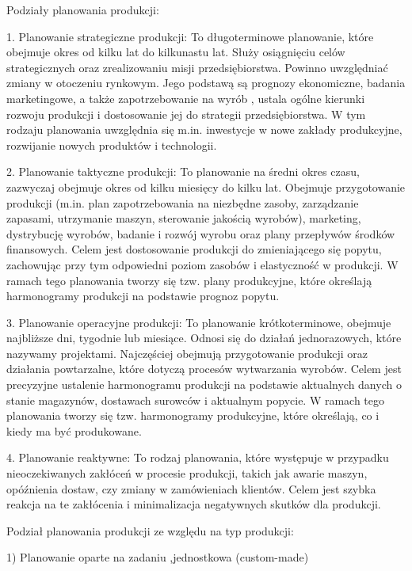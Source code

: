 Podziały planowania produkcji:

    1. Planowanie strategiczne produkcji: To długoterminowe planowanie, które obejmuje okres od kilku lat do kilkunastu lat. Służy osiągnięciu celów strategicznych oraz zrealizowaniu misji przedsiębiorstwa. Powinno uwzględniać zmiany w otoczeniu rynkowym. Jego podstawą są prognozy ekonomiczne, badania marketingowe, a także zapotrzebowanie na wyrób , ustala ogólne kierunki rozwoju produkcji i dostosowanie jej do strategii przedsiębiorstwa. W tym rodzaju planowania uwzględnia się m.in. inwestycje w nowe zakłady produkcyjne, rozwijanie nowych produktów i technologii.
    
    2. Planowanie taktyczne produkcji: To planowanie na średni okres czasu, zazwyczaj obejmuje okres od kilku miesięcy do kilku lat. Obejmuje przygotowanie produkcji (m.in. plan zapotrzebowania na niezbędne zasoby, zarządzanie zapasami, utrzymanie maszyn, sterowanie jakością wyrobów), marketing, dystrybucję wyrobów, badanie i rozwój wyrobu oraz plany przepływów środków finansowych. Celem jest dostosowanie produkcji do zmieniającego się popytu, zachowując przy tym odpowiedni poziom zasobów i elastyczność w produkcji. W ramach tego planowania tworzy się tzw. plany produkcyjne, które określają harmonogramy produkcji na podstawie prognoz popytu.
    
    3. Planowanie operacyjne produkcji: To planowanie krótkoterminowe, obejmuje najbliższe dni, tygodnie lub miesiące. Odnosi się do działań jednorazowych, które nazywamy projektami. Najczęściej obejmują przygotowanie produkcji oraz działania powtarzalne, które dotyczą procesów wytwarzania wyrobów. Celem jest precyzyjne ustalenie harmonogramu produkcji na podstawie aktualnych danych o stanie magazynów, dostawach surowców i aktualnym popycie. W ramach tego planowania tworzy się tzw. harmonogramy produkcyjne, które określają, co i kiedy ma być produkowane.
    
    4. Planowanie reaktywne: To rodzaj planowania, które występuje w przypadku nieoczekiwanych zakłóceń w procesie produkcji, takich jak awarie maszyn, opóźnienia dostaw, czy zmiany w zamówieniach klientów. Celem jest szybka reakcja na te zakłócenia i minimalizacja negatywnych skutków dla produkcji.

    Podział planowania produkcji ze względu na typ produkcji:

    1) Planowanie oparte na zadaniu ,jednostkowa (custom-made)

